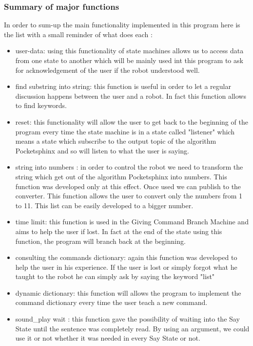 \newpage
\subsubsection{Summary of major functions}
In order to sum-up the main functionality implemented in this program here is the list with a small reminder of what does each :

\begin{itemize}
  \item user-data: using this functionality of state machines allows us to access data from one state to another which will be mainly used int this program to ask for acknowledgement of the user if the robot understood well.
  \item find substring into string: this function is useful in order to let a regular discussion happens between the user and a robot. In fact this function allows to find keywords. 
  \item reset: this functionality will allow the user to get back to the beginning of the program every time the state machine is in a state called "listener" which means a state which subscribe to the output topic of the algorithm Pocketsphinx and so will listen to what the user is saying.
  \item string into numbers : in order to control the robot we need to transform the string which get out of the algorithm Pocketsphinx into numbers. This function was developed only at this effect. Once used we can publish to the converter. This function allows the user to convert only the numbers from 1 to 11. This list can be easily developed to a bigger number.
  \item time limit: this function is used in the Giving Command Branch Machine and aims to help the user if lost. In fact at the end of the state using this function, the program will branch back at the beginning.
  \item consulting the commands dictionary: again this function was developed to help the user in his experience. If the user is lost or simply forgot what he taught to the robot he can simply ask by saying the keyword "list"
  \item dynamic dictionary: this function will allows the program to implement the command dictionary every time the user teach a new command. 
  \item sound\_play wait : this function gave the possibility of waiting into the Say State until the sentence was completely read. By using an argument, we could use it or not whether it was needed in every Say State or not.
\end{itemize}


